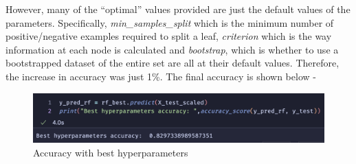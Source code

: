 \documentclass[a4, 11pt]{article}
\begin{document}
However, many of the ``optimal'' values provided are just the default values of the parameters. Specifically, \textit{min\_samples\_split} which is 
the minimum number of positive/negative examples required to split a leaf, \textit{criterion} which is the way information at each node is 
calculated and \textit{bootstrap}, which is whether to use a bootstrapped dataset of the entire set are all at their default values.
Therefore, the increase in accuracy was just 1\%. The final accuracy is shown below -
\begin{figure}[H]
    \center
    \includegraphics[scale=0.4]{fourth.png}
    \caption{Accuracy with best hyperparameters}
\end{figure}
\end{document}

